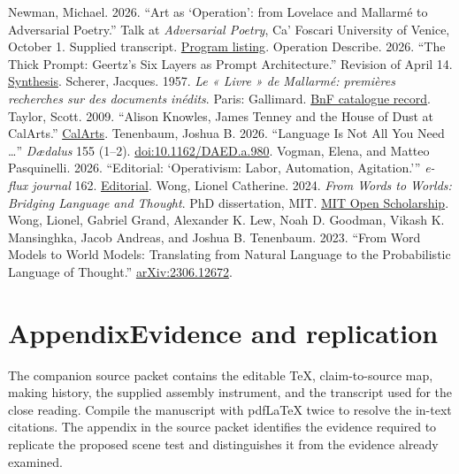 \documentclass[11pt,letterpaper]{article}
\newcommand{\work}[1]{\textit{#1}}
\newcommand{\src}[2]{\href{#1}{#2}}
\begin{document}
\begin{thebibliography}{99}
 Newman, Michael. 2026. “Art as ‘Operation’: from Lovelace and Mallarmé to Adversarial Poetry.” Talk at \work{Adversarial Poetry}, Ca’ Foscari University of Venice, October 1. Supplied transcript. \src{https://www.unive.it/web/en/19108/home/}{Program listing}.
 Operation Describe. 2026. “The Thick Prompt: Geertz’s Six Layers as Prompt Architecture.” Revision of April 14. \src{https://hartswf0.github.io/operation-describe/worldtext/syntheses/thick-prompt.md}{Synthesis}.
 Scherer, Jacques. 1957. \work{Le « Livre » de Mallarmé: premières recherches sur des documents inédits}. Paris: Gallimard. \src{https://catalogue.bnf.fr/ark:/12148/cb326102938}{BnF catalogue record}.
 Taylor, Scott. 2009. “Alison Knowles, James Tenney and the House of Dust at CalArts.” \src{https://blog.calarts.edu/2009/09/10/alison-knowles-james-tenney-and-the-house-of-dust-at-calarts/}{CalArts}.
 Tenenbaum, Joshua B. 2026. “Language Is Not All You Need …” \work{Dædalus} 155 (1–2). \src{https://doi.org/10.1162/DAED.a.980}{doi:10.1162/DAED.a.980}.
 Vogman, Elena, and Matteo Pasquinelli. 2026. “Editorial: ‘Operativism: Labor, Automation, Agitation.’” \work{e-flux journal} 162. \src{https://www.e-flux.com/journal/162/6776875/editorial-operativism-labor-automation-agitation}{Editorial}.
 Wong, Lionel Catherine. 2024. \work{From Words to Worlds: Bridging Language and Thought}. PhD dissertation, MIT. \src{https://hdl.handle.net/1721.1/157326}{MIT Open Scholarship}.
 Wong, Lionel, Gabriel Grand, Alexander K. Lew, Noah D. Goodman, Vikash K. Mansinghka, Jacob Andreas, and Joshua B. Tenenbaum. 2023. “From Word Models to World Models: Translating from Natural Language to the Probabilistic Language of Thought.” \src{https://arxiv.org/abs/2306.12672}{arXiv:2306.12672}.
\end{thebibliography}

\section*{Appendix\enspace Evidence and replication}
The companion source packet contains the editable TeX, claim-to-source map, making history, the supplied assembly instrument, and the transcript used for the close reading. Compile the manuscript with pdfLaTeX twice to resolve the in-text citations. The appendix in the source packet identifies the evidence required to replicate the proposed scene test and distinguishes it from the evidence already examined.
\end{document}
